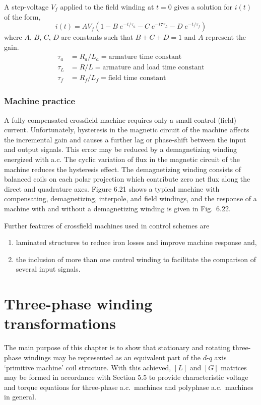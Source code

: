 \documentclass[a4paper,numbers=noenddot,12pt]{scrbook}
\begin{document}
A step-voltage $V_f$ applied to the field winding at $t = 0$ gives a solution for $i(t)$ of the form,
\begin{equation}
    i(t) = A V_f(1 - B \; e^{-t/\tau_a} - C \; e^{-t7\tau_L} - D \; e^{-t/\tau_f})
    \label{eq:Eq6.100}
\end{equation}
where $A$, $B$, $C$, $D$ are constants such that $B + C + D = 1$ and $A$ represent the gain.
\begin{align*}
    \tau_a & = R_a / L_a = \text{armature time constant} \\
    \tau_L & = R / L = \text{armature and load time constant} \\
    \tau_f & = R_f / L_f = \text{field time constant}
\end{align*}

\subsection{Machine practice}
A fully compensated crossfield machine requires only a small control (field) current. Unfortunately, hysteresis in the magnetic circuit of the machine affects the incremental gain and causes a further lag or phase-shift between the input and output signals. This error may be reduced by a demagnetizing winding energized with a.c. The cyclic variation of flux in the magnetic circuit of the machine reduces the hysteresis effect. The demagnetizing winding
consists of balanced coils on each polar projection which contribute zero net flux along the direct and quadrature axes. Figure 6.21 shows a typical machine with compensating, demagnetizing, interpole, and field windings, and the response of a machine with and without a demagnetizing winding is given in Fig.\ 6.22.

Further features of crossfield machines used in control schemes are
\begin{enumerate}
    \item laminated structures to reduce iron losses and improve machine response and,
    \item the inclusion of more than one control winding to facilitate the comparison of several input signals.
\end{enumerate}

\chapter{Three-phase winding transformations}
The main purpose of this chapter is to show that stationary and rotating three-phase windings may be represented as an equivalent part of the $d$-$q$ axis `primitive machine' coil structure. With this achieved, $[L]$ and $[G]$ matrices may be formed in accordance with Section 5.5 to provide characteristic voltage and torque equations for three-phase a.c.\ machines and polyphase a.c.\ machines in general.
\end{document}
